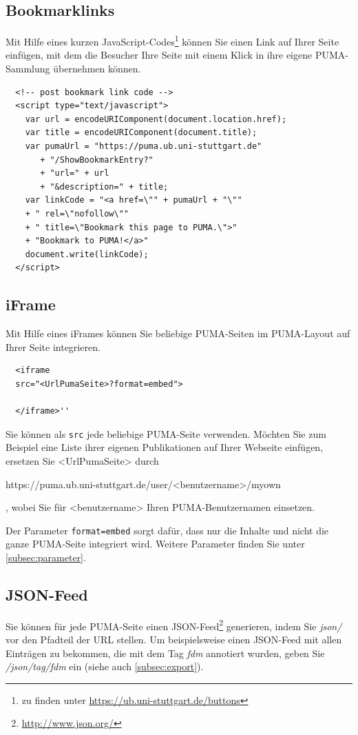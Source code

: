 \subsection{Bookmarklinks}
\label{subsec:bookmarklinks}
Mit Hilfe eines kurzen JavaScript-Codes\footnote{zu finden unter \url{https://ub.uni-stuttgart.de/buttons}} können Sie einen Link auf Ihrer Seite einfügen, mit dem die Besucher Ihre Seite mit einem Klick in ihre eigene PUMA-Sammlung übernehmen können.
\lstset{language=JavaScript}
\begin{lstlisting}
  <!-- post bookmark link code -->
  <script type="text/javascript">
    var url = encodeURIComponent(document.location.href);
    var title = encodeURIComponent(document.title);
    var pumaUrl = "https://puma.ub.uni-stuttgart.de"
       + "/ShowBookmarkEntry?"
       + "url=" + url
       + "&description=" + title;
    var linkCode = "<a href=\"" + pumaUrl + "\""
    + " rel=\"nofollow\""
    + " title=\"Bookmark this page to PUMA.\">"
    + "Bookmark to PUMA!</a>"
    document.write(linkCode);
  </script>
\end{lstlisting}

\subsection{iFrame}
\label{subsec:iFrame}
Mit Hilfe eines iFrames können Sie beliebige PUMA-Seiten im PUMA-Layout auf Ihrer Seite integrieren. 
\lstset{language=HTML}
\begin{lstlisting}
  <iframe
  src="<UrlPumaSeite>?format=embed">

  </iframe>''
\end{lstlisting}

Sie können als \texttt{src} jede beliebige PUMA-Seite verwenden. Möchten Sie zum Beispiel eine Liste ihrer eigenen Publikationen  auf Ihrer Webseite einfügen, ersetzen Sie <UrlPumaSeite> durch \begin{small}https://puma.ub.uni-stuttgart.de/user/<benutzername>/myown\end{small}, wobei Sie für <benutzername> Ihren PUMA-Benutzernamen einsetzen.

Der Parameter \texttt{format=embed} sorgt dafür, dass nur die Inhalte und nicht die ganze PUMA-Seite integriert wird. Weitere Parameter finden Sie unter \autoref{subsec:parameter}.

\subsection{JSON-Feed}
\label{subsec:jsonFeed}
Sie können für jede PUMA-Seite einen JSON-Feed\footnote{\url{http://www.json.org/}} generieren, indem Sie \textit{json/} vor den Pfadteil der URL stellen. Um beispielsweise einen JSON-Feed mit allen Einträgen zu bekommen, die mit dem Tag \textit{fdm} annotiert wurden, geben Sie \textit{/json/tag/fdm} ein (siehe auch \autoref{subsec:export}). 

